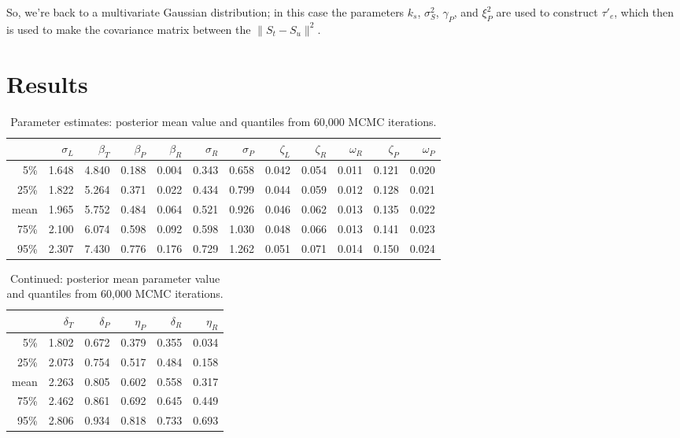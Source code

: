 \documentclass{article}
\begin{document}
So, we're back to a multivariate Gaussian distribution;
in this case the parameters $k_s$, $\sigma^2_S$, $\gamma_P$, and $\xi^2_P$ are used to construct $\tau'_e$,
which then is used to make the covariance matrix between the $\|S_t - S_u\|^2$.

\section{Results}

\begin{table}[ht]
\centering
\begin{tabular}{rrrrrrrrrrrr}
  \hline
 & $\sigma_L$ & $\beta_T$ & $\beta_P$ & $\beta_R$ & $\sigma_R$ & $\sigma_P$ & $\zeta_L$ & $\zeta_R$ & $\omega_R$ & $\zeta_P$ & $\omega_P$ \\ 
  \hline
5\% & 1.648 & 4.840 & 0.188 & 0.004 & 0.343 & 0.658 & 0.042 & 0.054 & 0.011 & 0.121 & 0.020 \\ 
  25\% & 1.822 & 5.264 & 0.371 & 0.022 & 0.434 & 0.799 & 0.044 & 0.059 & 0.012 & 0.128 & 0.021 \\ 
  mean & 1.965 & 5.752 & 0.484 & 0.064 & 0.521 & 0.926 & 0.046 & 0.062 & 0.013 & 0.135 & 0.022 \\ 
  75\% & 2.100 & 6.074 & 0.598 & 0.092 & 0.598 & 1.030 & 0.048 & 0.066 & 0.013 & 0.141 & 0.023 \\ 
  95\% & 2.307 & 7.430 & 0.776 & 0.176 & 0.729 & 1.262 & 0.051 & 0.071 & 0.014 & 0.150 & 0.024 \\ 
   \hline
\end{tabular}
\caption{Parameter estimates: posterior mean value and quantiles from 60,000 MCMC iterations.}
\end{table}



\begin{table}[ht]
\centering
\begin{tabular}{rrrrrr}
  \hline
 & $\delta_T$ & $\delta_P$ & $\eta_P$ & $\delta_R$ & $\eta_R$ \\ 
  \hline
  5\% & 1.802 & 0.672 & 0.379 & 0.355 & 0.034 \\ 
  25\% & 2.073 & 0.754 & 0.517 & 0.484 & 0.158 \\ 
  mean & 2.263 & 0.805 & 0.602 & 0.558 & 0.317 \\ 
  75\% & 2.462 & 0.861 & 0.692 & 0.645 & 0.449 \\ 
  95\% & 2.806 & 0.934 & 0.818 & 0.733 & 0.693 \\ 
   \hline
\end{tabular}
\caption{Continued: posterior mean parameter value and quantiles from 60,000 MCMC iterations.}
\end{table}
\end{document}
